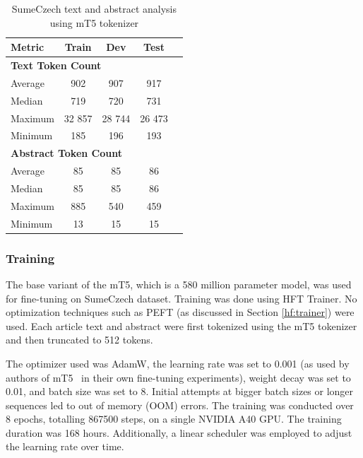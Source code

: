 \documentclass[english, ba, kiv, he, iso690numb, pdf, viewonly]{fasthesis}
\begin{document}
\begin{table}[htbp]
    \centering
    \caption{SumeCzech text and abstract analysis using mT5 tokenizer}
    \label{tab:tokenized_text_abstract_metrics}
    \begin{tabular}{lcccc}
        \toprule
        \textbf{Metric} & {\textbf{Train}} & {\textbf{Dev}} & {\textbf{Test}} \\
        \midrule
        \multicolumn{4}{l}{\textbf{Text Token Count}} \\
        \midrule
        Average & 902 & 907 & 917 \\
        Median & 719 & 720 & 731 \\
        Maximum & 32 857 & 28 744 & 26 473 \\
        Minimum & 185 & 196 & 193 \\
        \midrule
        \multicolumn{4}{l}{\textbf{Abstract Token Count}} \\
        \midrule
        Average & 85 & 85 & 86 \\
        Median & 85 & 85 & 86 \\
        Maximum & 885 & 540 & 459 \\
        Minimum & 13 & 15 & 15 \\
        \bottomrule
    \end{tabular}
\end{table}




\subsubsection{Training}
The base variant of the mT5, which is a 580 million parameter model, was used for fine-tuning on SumeCzech dataset. Training was done using HFT Trainer. No optimization techniques such as PEFT (as discussed in Section \ref{hf:trainer}) were used. Each article text and abstract were first tokenized using the mT5 tokenizer and then truncated to 512 tokens.

The optimizer used was AdamW, the learning rate was set to 0.001 (as used by authors of mT5~\cite{xue-etal-2021-mt5} in their own fine-tuning experiments), weight decay was set to 0.01, and batch size was set to 8. Initial attempts at bigger batch sizes or longer sequences led to out of memory (OOM) errors. The training was conducted over 8 epochs, totalling 867500 steps, on a single NVIDIA A40 GPU. The training duration was 168 hours. Additionally, a linear scheduler was employed to adjust the learning rate over time.
\end{document}
